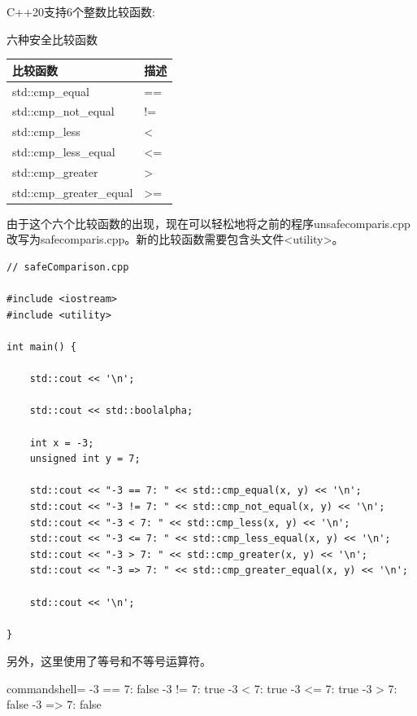 C++20支持6个整数比较函数:

\begin{center}
六种安全比较函数
\end{center}

\begin{table}[H]
\centering
\begin{tabular}{ll}
\textbf{比较函数} & \textbf{描述} \\ \hline
std::cmp\_equal           & ==               \\ \hline
std::cmp\_not\_equal      & !=               \\ \hline
std::cmp\_less            & \textless{}      \\ \hline
std::cmp\_less\_equal     & \textless{}=     \\ \hline
std::cmp\_greater         & \textgreater{}   \\ \hline
std::cmp\_greater\_equal  & \textgreater{}=  \\ \hline
\end{tabular}
\end{table}

由于这个六个比较函数的出现，现在可以轻松地将之前的程序unsafecomparis.cpp改写为safecomparis.cpp。新的比较函数需要包含头文件<utility>。

\begin{lstlisting}[style=styleCXX]
// safeComparison.cpp

#include <iostream>
#include <utility>

int main() {
	
	std::cout << '\n';
	
	std::cout << std::boolalpha;
	
	int x = -3;
	unsigned int y = 7;
	
	std::cout << "-3 == 7: " << std::cmp_equal(x, y) << '\n';
	std::cout << "-3 != 7: " << std::cmp_not_equal(x, y) << '\n';
	std::cout << "-3 < 7: " << std::cmp_less(x, y) << '\n';
	std::cout << "-3 <= 7: " << std::cmp_less_equal(x, y) << '\n';
	std::cout << "-3 > 7: " << std::cmp_greater(x, y) << '\n';
	std::cout << "-3 => 7: " << std::cmp_greater_equal(x, y) << '\n';
	
	std::cout << '\n';
	
}
\end{lstlisting}

另外，这里使用了等号和不等号运算符。

\begin{tcblisting}{commandshell={}}
-3 == 7: false
-3 != 7: true
-3 < 7: true
-3 <= 7: true
-3 > 7: false
-3 => 7: false
\end{tcblisting}

